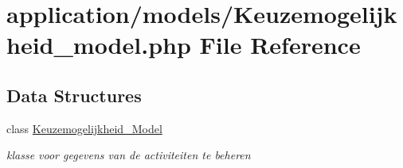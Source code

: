 \hypertarget{_keuzemogelijkheid__model_8php}{}\section{application/models/\+Keuzemogelijkheid\+\_\+model.php File Reference}
\label{_keuzemogelijkheid__model_8php}
\subsection*{Data Structures}
\begin{DoxyCompactItemize}
\item 
class \mbox{\hyperlink{class_keuzemogelijkheid___model}{Keuzemogelijkheid\+\_\+\+Model}}
\begin{DoxyCompactList}\small\item\em klasse voor gegevens van de activiteiten te beheren \end{DoxyCompactList}\end{DoxyCompactItemize}
